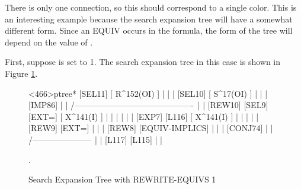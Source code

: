 There is only one connection, so this should correspond to a single
color.  This is an interesting example because the search expansion tree will
have a somewhat different form.  Since an EQUIV occurs in the formula,
the form of the tree will depend on the value of .

First, suppose  is set to 1.  The search
expansion tree in this case is shown in Figure \ref{thm12-search-etree1}.

\begin{figure}
\begin{tpsexample}
<466>ptree*
                                        [SEL11]
                                      [ R^152(OI) ]
                                            |
                                            |
                                            |
                                        [SEL10]
                                      [ S^17(OI) ]
                                            |
                                            |
                                            |
                                        [IMP86]
                                            |
                                            |
                      /-------------------------------------------\
                      |                                           |
                  [REW10]                                      [SEL9]
                   [EXT=]                                   [ X^141(I) ]
                      |                                           |
                      |                                           |
                      |                                           |
                   [EXP7]                                      [L116]
                [ X^141(I) ]                                      |
                      |                                           |
                      |
                      |
                   [REW9]
                   [EXT=]
                      |
                      |
                      |
                   [REW8]
              [EQUIV-IMPLICS]
                      |
                      |
                      |
                  [CONJ74]
                      |
                      |
           /---------------------\
           |                     |
        [L117]                [L115]
           |                     |
\end{tpsexample}
\caption{Search Expansion Tree with REWRITE-EQUIVS 1}
\label{thm12-search-etree1}.
\end{figure}

